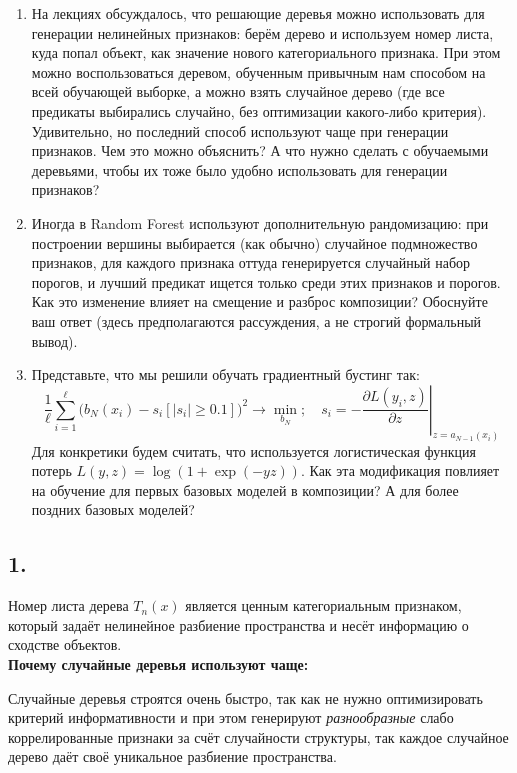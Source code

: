 \documentclass[12pt,a4paper]{article}
\begin{document}
\begin{enumerate}
\item На лекциях обсуждалось, что решающие деревья можно использовать для генерации нелинейных признаков: берём дерево и используем номер листа, куда попал объект, как значение нового категориального признака. При этом можно воспользоваться деревом, обученным привычным нам способом на всей обучающей выборке, а можно взять случайное дерево (где все предикаты выбирались случайно, без оптимизации какого-либо критерия). Удивительно, но последний способ используют чаще при генерации признаков. Чем это можно объяснить? А что нужно сделать с обучаемыми деревьями, чтобы их тоже было удобно использовать для генерации признаков?

\item Иногда в Random Forest используют дополнительную рандомизацию: при построении вершины выбирается (как обычно) случайное подмножество признаков, для каждого признака оттуда генерируется случайный набор порогов, и лучший предикат ищется только среди этих признаков и порогов. Как это изменение влияет на смещение и разброс композиции? Обоснуйте ваш ответ (здесь предполагаются рассуждения, а не строгий формальный вывод).

\item Представьте, что мы решили обучать градиентный бустинг так:
\[
\frac{1}{\ell}\sum_{i=1}^{\ell}\bigl(b_N(x_i) - s_i[|s_i| \geqslant 0.1]\bigr)^2 \to \min_{b_N};\quad
s_i = -\left.\frac{\partial L(y_i, z)}{\partial z}\right|_{z=a_{N-1}(x_i)}
\]
Для конкретики будем считать, что используется логистическая функция потерь $L(y,z) = \log(1+\exp(-yz))$. Как эта модификация повлияет на обучение для первых базовых моделей в композиции? А для более поздних базовых моделей?
\end{enumerate}

\subsection*{1.}

Номер листа дерева $T_n(x)$ является ценным категориальным признаком, который задаёт нелинейное разбиение пространства и несёт информацию о сходстве объектов.\\[1mm]
\textbf{Почему случайные деревья используют чаще:}

Случайные деревья строятся очень быстро, так как не нужно оптимизировать критерий информативности и при этом генерируют \textit{разнообразные} слабо коррелированные признаки за счёт случайности структуры, так каждое случайное дерево даёт своё уникальное разбиение пространства.
\end{document}
